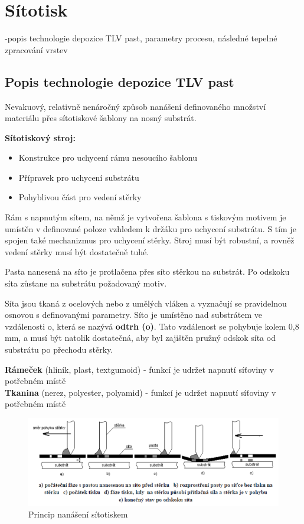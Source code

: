 \section{Sítotisk}
-popis technologie depozice TLV past, parametry procesu, následné tepelné
zpracování vrstev

\subsection{Popis technologie depozice TLV past}
Nevakuový, relativně nenáročný způsob nanášení definovaného množství materiálu přes sítotiskové šablony na nosný substrát.

\textbf{Sítotiskový stroj:}
\begin{itemize}
\item Konstrukce pro uchycení rámu nesoucího šablonu
\item Přípravek pro uchycení substrátu
\item Pohyblivou část pro vedení stěrky
\end{itemize}

Rám s napnutým sítem, na němž je vytvořena šablona s tiskovým motivem je umístěn
v definované poloze vzhledem k držáku pro uchycení substrátu. S tím je spojen také mechanizmus pro uchycení stěrky. Stroj musí být robustní, a rovněž vedení stěrky musí být dostatečně tuhé.

Pasta nanesená na síto je protlačena přes síto stěrkou na substrát. Po odskoku síta
zůstane na substrátu požadovaný motiv.

Síta jsou tkaná z ocelových nebo z umělých vláken a vyznačují se pravidelnou osnovou
s definovanými parametry. Síto je umístěno nad substrátem ve vzdálenosti o, která se nazývá \textbf{odtrh (o)}. Tato vzdálenost se pohybuje kolem 0,8 mm, a musí být natolik dostatečná, aby byl zajištěn pružný odskok síta od substrátu po přechodu stěrky.

\textbf{Rámeček} (hliník, plast, textgumoid) - funkcí je udržet napnutí síťoviny v potřebném místě\\
\textbf{Tkanina} (nerez, polyester, polyamid) - funkcí je udržet napnutí síťoviny v potřebném místě
\begin{figure}[h]
   \begin{center}
     \includegraphics[scale=0.6]{images/Sitotisk.png}
   \end{center}
   \caption{Princip nanášení sítotiskem}
\end{figure}
\newpage

